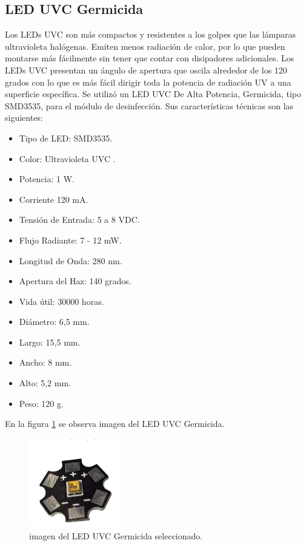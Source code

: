 \subsection{LED UVC Germicida }
Los LEDs UVC son más compactos y resistentes a los golpes que las lámparas ultravioleta halógenas. Emiten menos radiación de calor, por lo que pueden montarse más fácilmente sin tener que contar con disipadores adicionales. 
Los LEDs UVC presentan un ángulo de apertura que oscila alrededor de los 120 grados con lo que es más fácil dirigir toda la potencia de radiación UV a una superficie específica.
Se utilizó un LED UVC De Alta Potencia, Germicida, tipo SMD3535, para el módulo de desinfección. Sus características técnicas son las siguientes:

\begin{itemize}
	\item Tipo de LED:		SMD3535.
	\item Color:		Ultravioleta UVC .
	\item Potencia:		1 W.
	\item Corriente		120 mA.	
	\item Tensión de Entrada:	5 a 8 VDC.
	\item Flujo Radiante:	7 - 12 mW.
	\item Longitud de Onda:	280 nm.
	\item Apertura del Haz:	140 grados.	
	\item Vida útil:	30000 horas.	
	\item Diámetro:		6,5 mm.	
	\item Largo:		15,5 mm.	
	\item Ancho:		8 mm.		
	\item Alto:			5,2 mm.		
	\item Peso: 		120 g.		
\end{itemize}


En la figura \ref{fig:leduvc} se observa imagen del LED UVC Germicida.

\begin{figure}[h]
	\centering
	\includegraphics[width=4cm]{./Figures/leduvc.PNG}
	\caption{imagen del LED UVC Germicida seleccionado\protect\footnotemark.}
	\label{fig:leduvc}
\end{figure}




